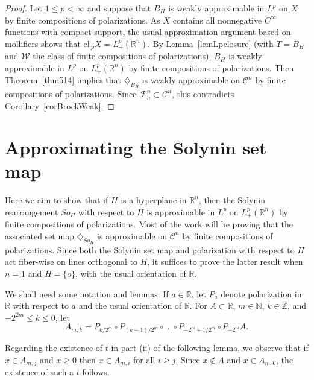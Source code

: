 \documentclass[12pt,reqno]{amsart}
\newcommand{\N}{{\mathbb N}}
\newcommand{\R}{{\mathbb R}}
\newcommand{\Z}{{\mathbb Z}}
\newcommand{\cF}{\mathcal F}
\newcommand{\cW}{{\mathcal W}}
\newcommand{\cl}{{\mathrm{cl}}\,}
\newcommand{\di}{\diamondsuit}
\numberwithin{equation}{section}
\begin{document}
\begin{proof}
Let $1\le p<\infty$ and suppose that $B_H$ is weakly approximable in $L^p$ on $X$ by finite compositions of polarizations. As $X$ contains all nonnegative $C^{\infty}$ functions with compact support, the usual approximation argument based on mollifiers shows that $\cl_p X=L_+^p(\R^n)$.  By Lemma~\ref{lemLpclosure} (with $T=B_H$ and $\cW$ the class of finite compositions of polarizations), $B_H$ is weakly approximable in $L^p$ on $L_+^p(\R^n)$ by finite compositions of polarizations.  Then Theorem~\ref{thm514} implies that $\di_{B_H}$ is weakly approximable on $\mathcal C^n$ by finite compositions of polarizations.  Since ${\cF}^n_n\subset\mathcal C^n$, this contradicts  Corollary~\ref{corBrockWeak}.
\end{proof}

\section{Approximating the Solynin set map}\label{Solynin}

Here we aim to show that if $H$ is a hyperplane in $\R^n$, then the Solynin rearrangement $So_H$ with respect to $H$ is approximable in $L^p$ on $L^p_+(\R^n)$ by finite compositions of polarizations.  Most of the work will be proving that the associated set map $\di_{So_H}$ is approximable on ${\mathcal{C}}^n$ by finite compositions of polarizations.  Since both the Solynin set map and polarization with respect to $H$ act fiber-wise on lines orthogonal to $H$, it suffices to prove the latter result when $n=1$ and $H=\{o\}$, with the usual orientation of $\R$.

We shall need some notation and lemmas. If $a\in \R$, let $P_a$ denote polarization in $\R$ with respect to $a$ and the usual orientation of $\R$. For $A\subset \R$, $m\in \N$, $k\in\Z$, and $-2^{2m}\leq k\leq 0$, let
\[
 A_{m,k}=P_{k/2^m}\circ P_{(k-1)/2^m}\circ\dots\circ P_{-2^m+1/2^m}\circ P_{-2^m}A.
\]

Regarding the existence of $t$ in part (ii) of the following lemma, we observe that if $x\in A_{m,j}$ and $x\geq0$ then $x\in A_{m,i}$ for all $i\geq j$. Since $x\notin A$ and $x\in A_{m,0}$, the existence of such a $t$ follows.
\end{document}
